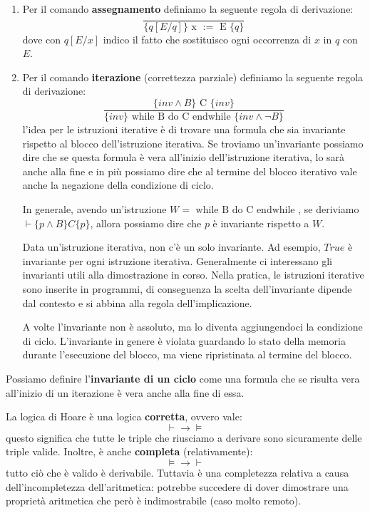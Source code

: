 \begin{enumerate}
    \item Per il comando \textbf{assegnamento} definiamo la seguente regola di derivazione:
    \begin{equation}
        \frac{}{\{q[E/q]\} \text{ x } := \text{ E }\{q\}}
    \end{equation}
    dove con $q[E / x]$ indico il fatto che sostituisco ogni occorrenza di $x$ in $q$ con $E$.
    \item Per il comando \textbf{iterazione} (correttezza parziale) definiamo la seguente regola di derivazione:
    \begin{equation}
        \frac{\{inv \land B\} \text{ C } \{inv\}}{\{inv\} \text{ while B do C endwhile } \{inv \land \lnot B\}}
    \end{equation}
    l'idea per le istruzioni iterative è di trovare una formula che sia invariante rispetto al blocco dell'istruzione iterativa. Se troviamo un'invariante possiamo dire che se questa formula è vera all'inizio dell'istruzione iterativa, lo sarà anche alla fine e in più possiamo dire che al termine del blocco iterativo vale anche la negazione della condizione di ciclo.
    
    In generale, avendo un'istruzione $W = \text{ while B do C endwhile }$, se deriviamo $\vdash \{p \land B\} C \{p\}$, allora possiamo dire che $p$ è invariante rispetto a $W$.
    
    Data un'istruzione iterativa, non c'è un solo invariante. Ad esempio, $True$ è invariante per ogni istruzione iterativa. Generalmente ci interessano gli invarianti utili alla dimostrazione in corso. Nella pratica, le istruzioni iterative sono inserite in programmi, di conseguenza la scelta dell'invariante dipende dal contesto e si abbina alla regola dell'implicazione.
    
    A volte l'invariante non è assoluto, ma lo diventa aggiungendoci la condizione di ciclo. L'invariante in genere è violata guardando lo stato della memoria durante l'esecuzione del blocco, ma viene ripristinata al termine del blocco.
\end{enumerate}

\begin{definizione}
    Possiamo definire l'\textbf{invariante di un ciclo} come una formula che se risulta vera all'inizio di un iterazione è vera anche alla fine di essa.
\end{definizione}

La logica di Hoare è una logica \textbf{corretta}, ovvero vale:
\begin{equation}
    \vdash \to \models
\end{equation}
questo significa che tutte le triple che riusciamo a derivare sono sicuramente delle triple valide. Inoltre, è anche \textbf{completa} (relativamente):
\begin{equation}
    \models \to \vdash
\end{equation}
tutto ciò che è valido è derivabile. Tuttavia è una completezza relativa a causa dell'incompletezza dell'aritmetica: potrebbe succedere di dover dimostrare una proprietà aritmetica che però è indimostrabile (caso molto remoto).

